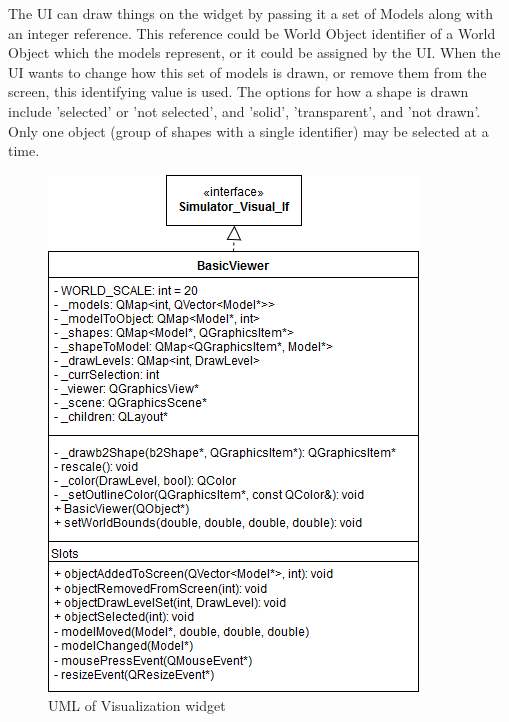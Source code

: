The UI can draw things on the widget by passing it a set of Models along with an integer reference. This reference could be World Object identifier of a World Object which the models represent, or it could be assigned by the UI. When the UI wants to change how this set of models is drawn, or remove them from the screen, this identifying value is used.
The options for how a shape is drawn include 'selected' or 'not selected', and 'solid', 'transparent', and 'not drawn'. Only one object (group of shapes with a single identifier) may be selected at a time.
 \begin{figure}
 	\begin{center}
 	\includegraphics[scale=0.5]{./images_design/uml/BasicViewer}
 	\caption{UML of Visualization widget\label{uml:viewwidget}}
 	\end{center}
 \end{figure}
 
